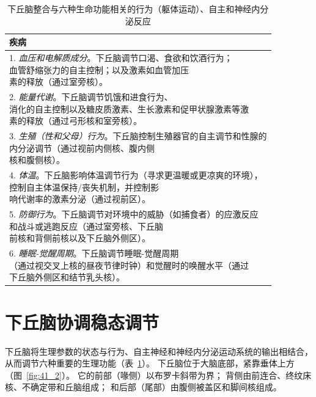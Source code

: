 \begin{table}[htbp]
	\caption{下丘脑整合与六种生命功能相关的行为（躯体运动）、自主和神经内分泌反应} \label{tab:41_1} \centering
	\begin{tabular}{l}
		\toprule
		疾病 \\
		\midrule
		\makecell[l]{1. \textit{血压和电解质成分}。下丘脑调节口渴、食欲和饮酒行为；\\血管舒缩张力的自主控制；以及激素如血管加压\\素的释放（通过室旁核）。}  \\
		\makecell[l]{2. \textit{能量代谢}。下丘脑调节饥饿和进食行为、\\消化的自主控制以及糖皮质激素、生长激素和促甲状腺激素等激\\素的释放（通过弓形核和室旁核）。}  \\
		\makecell[l]{3. \textit{生殖（性和父母）行为}。下丘脑控制生殖器官的自主调节和性腺的\\内分泌调节（通过视前内侧核、腹内侧\\核和腹侧核）。}  \\
		\makecell[l]{4. \textit{体温}。下丘脑影响体温调节行为（寻求更温暖或更凉爽的环境），\\控制自主体温保持/丧失机制，并控制影\\响代谢率的激素分泌（通过视前区）。}  \\
		\makecell[l]{5. \textit{防御行为}。下丘脑调节对环境中的威胁（如捕食者）的应激反应\\和战斗或逃跑反应（通过室旁核、下丘脑\\前核和背侧前核以及下丘脑外侧区）。}  \\
		\makecell[l]{6. \textit{睡眠-觉醒周期}。下丘脑调节睡眠-觉醒周期\\（通过视交叉上核的昼夜节律时钟）和觉醒时的唤醒水平（通过\\下丘脑外侧区和结节乳头核）。}  \\
		\bottomrule
	\end{tabular}
\end{table}

\section{下丘脑协调稳态调节}

下丘脑将生理参数的状态与行为、自主神经和神经内分泌运动系统的输出相结合，从而调节六种重要的生理功能（表~\ref{tab:41_1}）。
下丘脑位于大脑底部，紧靠垂体上方（图~\ref{fig:41_2}）。
它的前部（喙侧）以布罗卡斜带为界；
背侧由前连合、终纹床核、不确定带和丘脑组成；
和后部（尾部）由腹侧被盖区和脚间核组成。


